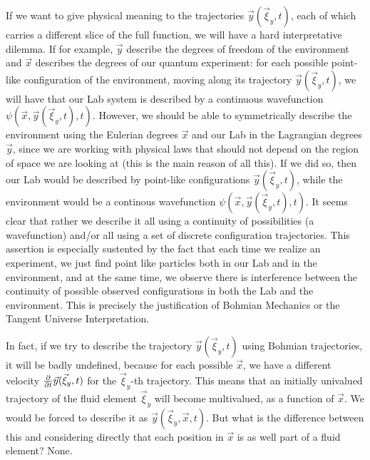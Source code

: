 \documentclass[11pt, a4paper]{article} %
\begin{document}
If we want to give physical meaning to the trajectories $\vec{y}(\vec{\xi}_y,t)$, each of which carries a different slice of the full function, we will have a hard interpretative dilemma. If for example, $\vec{y}$ describe the degrees of freedom of the environment and $\vec{x}$ describes the degrees of our quantum experiment: for each possible point-like configuration of the environment, moving along its trajectory $\vec{y}(\vec{\xi}_y,t)$, we will have that our Lab system is described by a continuous wavefunction $\psi(\vec{x},\vec{y}(\vec{\xi}_y,t),t)$. However, we should be able to symmetrically describe the environment using the Eulerian degrees $\vec{x}$ and our Lab in the Lagrangian degrees $\vec{y}$, since we are working with physical laws that should not depend on the region of space we are looking at (this is the main reason of all this). If we did so, then our Lab would be described by point-like configurations $\vec{y}(\vec{\xi}_y,t)$, while the environment would be a continous wavefunction $\psi(\vec{x},\vec{y}(\vec{\xi}_y,t),t)$. It seems clear that rather we describe it all using a continuity of possibilities (a wavefunction) and/or all using a set of discrete configuration trajectories. This assertion is especially sustented by the fact that each time we realize an experiment, we just find point like particles both in our Lab and in the environment, and at the same time, we observe there is interference between the continuity of possible observed configurations in both the Lab and the environment. This is precisely the justification of Bohmian Mechanics or the Tangent Universe Interpretation. 

In fact, if we try to describe the trajectory $\vec{y}(\vec{\xi}_y,t)$ using Bohmian trajectories, it will be badly undefined, because for each possible $\vec{x}$, we have a different velocity $\pdv{}{t}\vec{y}(\vec{\xi}_y,t)$ for the $\vec{\xi}_y$-th trajectory. This means that an initially univalued trajectory of the fluid element $\vec{\xi}_y$ will become multivalued, as a function of $\vec{x}$. We would be forced to describe it as $\vec{y}(\vec{\xi}_y, \vec{x},t)$. But what is the difference between this and considering directly that each position in $\vec{x}$ is as well part of a fluid element? None.
\end{document}
